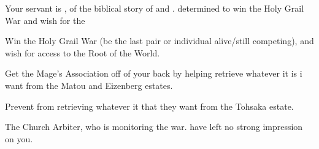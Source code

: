 \documentclass[char]{FDD}
\begin{document}
Your servant is \cBerserker{}, of the biblical story of \cAssassin{} and \cBerserker{}. \cBerserker{\They} \cBerserker{\are} determined to win the Holy Grail War and wish for the 

\begin{itemz}[Goals]
	\item Win the Holy Grail War (be the last pair or individual alive/still competing), and wish for access to the Root of the World.
	\item Get the Mage's Association off of your back by helping \cRi{\full} retrieve whatever it is i{\they} want from the Matou and Eizenberg estates.
	\item Prevent \cRi{} from retrieving whatever it that they want from the Tohsaka estate.
\end{itemz}

\begin{itemz}[Notes]
	\item 
\end{itemz}

\begin{contacts}
	\contact{\cBerserker{}}
	\contact{\cMatou{}}
	\contact{\cEizenberg{}}
	\contact{\cRi{}}
	\contact{\cArchibald{}} The Church Arbiter, who is monitoring the war. \cArchibald{\They} have left no strong impression on you. 
\end{contacts}
\end{document}
